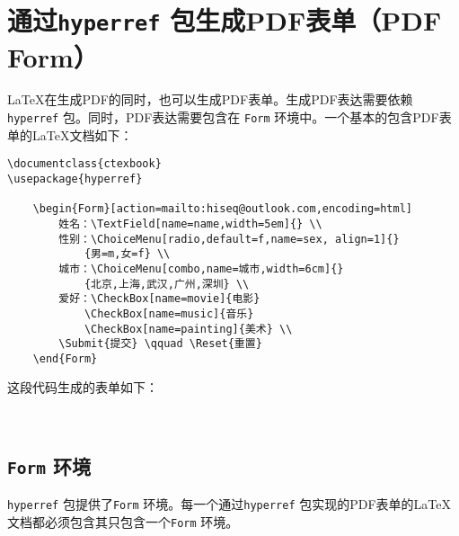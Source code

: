 \section{通过\texttt{hyperref} 包生成PDF表单（PDF Form）}
	\LaTeX 在生成PDF的同时，也可以生成PDF表单。生成PDF表达需要依赖 \texttt{hyperref} 包。同时，PDF表达需要包含在 \texttt{Form} 环境中。一个基本的包含PDF表单的\LaTeX 文档如下：
\begin{verbatim}
\documentclass{ctexbook}
\usepackage{hyperref}

    \begin{Form}[action=mailto:hiseq@outlook.com,encoding=html]
        姓名：\TextField[name=name,width=5em]{} \\
        性别：\ChoiceMenu[radio,default=f,name=sex, align=1]{}
            {男=m,女=f} \\
        城市：\ChoiceMenu[combo,name=城市,width=6cm]{}
            {北京,上海,武汉,广州,深圳} \\
        爱好：\CheckBox[name=movie]{电影}
            \CheckBox[name=music]{音乐}
            \CheckBox[name=painting]{美术} \\
        \Submit{提交} \qquad \Reset{重置}
    \end{Form}

\end{verbatim}

这段代码生成的表单如下：

\noindent {}\\

\subsection{\texttt{Form} 环境}
\texttt{hyperref} 包提供了\texttt{Form} 环境。每一个通过\texttt{hyperref} 包实现的PDF表单的\LaTeX 文档都必须包含其只包含一个\texttt{Form} 环境。

